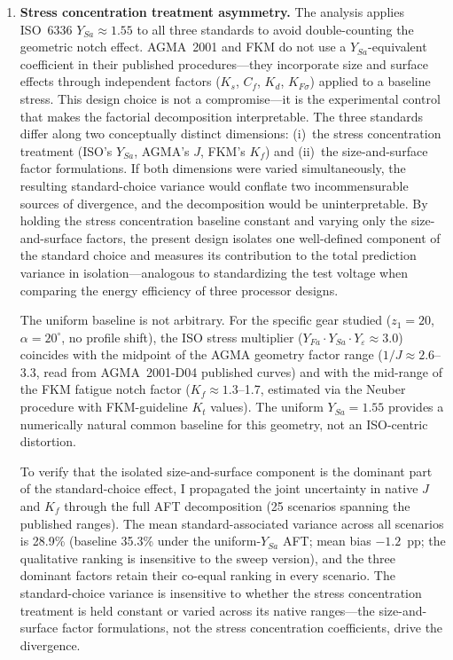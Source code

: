 \documentclass[12pt,a4paper]{article}
\begin{document}
\begin{enumerate}
  \item \textbf{Stress concentration treatment asymmetry.} The analysis
        applies ISO~6336 $Y_{Sa} \approx 1.55$ to all three standards to
        avoid double-counting the geometric notch effect. AGMA~2001
        and FKM do not use a $Y_{Sa}$-equivalent coefficient in their
        published procedures---they incorporate size and surface effects
        through independent factors ($K_s$, $C_f$, $K_d$, $K_{F\sigma}$)
        applied to a baseline stress. This design choice is not a
        compromise---it is the experimental control that makes the
        factorial decomposition interpretable. The three standards differ
        along two conceptually distinct dimensions: (i)~the stress
        concentration treatment (ISO's $Y_{Sa}$, AGMA's $J$, FKM's
        $K_f$) and (ii)~the size-and-surface factor formulations. If both
        dimensions were varied simultaneously, the resulting
        standard-choice variance would conflate two incommensurable sources
        of divergence, and the decomposition would be uninterpretable. By
        holding the stress concentration baseline constant and varying only
        the size-and-surface factors, the present design isolates one
        well-defined component of the standard choice and measures its
        contribution to the total prediction variance in
        isolation---analogous to standardizing the test voltage when
        comparing the energy efficiency of three processor designs.

        The uniform baseline is not arbitrary. For the specific gear
        studied ($z_1=20$, $\alpha=20^\circ$, no profile shift), the
        ISO stress multiplier ($Y_{Fa} \cdot Y_{Sa} \cdot Y_\varepsilon
        \approx 3.0$) coincides with the midpoint of the AGMA geometry
        factor range ($1/J \approx 2.6$--3.3, read from AGMA~2001-D04
        published curves) and with the mid-range of the FKM fatigue notch
        factor ($K_f \approx 1.3$--1.7, estimated via the Neuber
        procedure with FKM-guideline $K_t$ values). The uniform
        $Y_{Sa}=1.55$ provides a numerically natural common baseline
        for this geometry, not an ISO-centric distortion.

        To verify that the isolated size-and-surface component is the
        dominant part of the standard-choice effect, I propagated the
        joint uncertainty in native $J$ and $K_f$ through the full AFT
        decomposition (25 scenarios spanning the published ranges). The
        mean standard-associated variance across all scenarios is 28.9\%
        (baseline 35.3\% under the uniform-$Y_{Sa}$ AFT; mean bias
$-1.2$~pp; the qualitative ranking is insensitive to the sweep
version), and the three dominant
        factors retain their co-equal ranking in every scenario. The
        standard-choice variance is insensitive to whether the
        stress concentration treatment is held constant or varied across
        its native ranges---the size-and-surface factor formulations, not
        the stress concentration coefficients, drive the divergence.


\end{enumerate}
\end{document}

